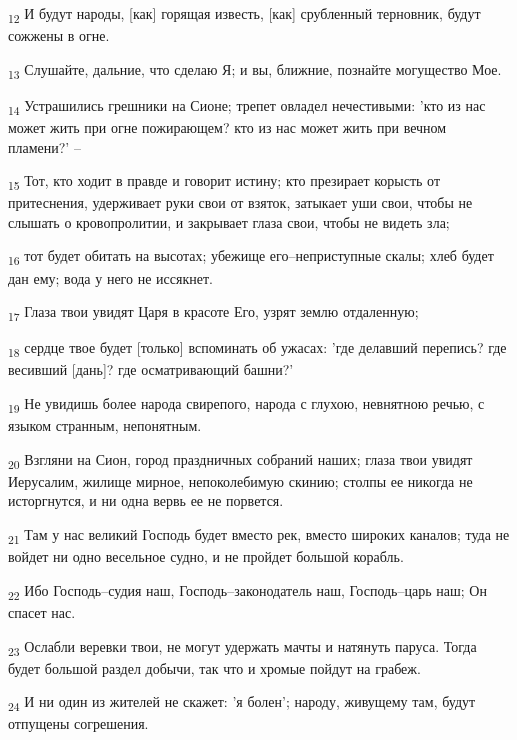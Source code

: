 \begin{tcolorbox}
\textsubscript{12} И будут народы, [как] горящая известь, [как] срубленный терновник, будут сожжены в огне.
\end{tcolorbox}
\begin{tcolorbox}
\textsubscript{13} Слушайте, дальние, что сделаю Я; и вы, ближние, познайте могущество Мое.
\end{tcolorbox}
\begin{tcolorbox}
\textsubscript{14} Устрашились грешники на Сионе; трепет овладел нечестивыми: 'кто из нас может жить при огне пожирающем? кто из нас может жить при вечном пламени?' --
\end{tcolorbox}
\begin{tcolorbox}
\textsubscript{15} Тот, кто ходит в правде и говорит истину; кто презирает корысть от притеснения, удерживает руки свои от взяток, затыкает уши свои, чтобы не слышать о кровопролитии, и закрывает глаза свои, чтобы не видеть зла;
\end{tcolorbox}
\begin{tcolorbox}
\textsubscript{16} тот будет обитать на высотах; убежище его--неприступные скалы; хлеб будет дан ему; вода у него не иссякнет.
\end{tcolorbox}
\begin{tcolorbox}
\textsubscript{17} Глаза твои увидят Царя в красоте Его, узрят землю отдаленную;
\end{tcolorbox}
\begin{tcolorbox}
\textsubscript{18} сердце твое будет [только] вспоминать об ужасах: 'где делавший перепись? где весивший [дань]? где осматривающий башни?'
\end{tcolorbox}
\begin{tcolorbox}
\textsubscript{19} Не увидишь более народа свирепого, народа с глухою, невнятною речью, с языком странным, непонятным.
\end{tcolorbox}
\begin{tcolorbox}
\textsubscript{20} Взгляни на Сион, город праздничных собраний наших; глаза твои увидят Иерусалим, жилище мирное, непоколебимую скинию; столпы ее никогда не исторгнутся, и ни одна вервь ее не порвется.
\end{tcolorbox}
\begin{tcolorbox}
\textsubscript{21} Там у нас великий Господь будет вместо рек, вместо широких каналов; туда не войдет ни одно весельное судно, и не пройдет большой корабль.
\end{tcolorbox}
\begin{tcolorbox}
\textsubscript{22} Ибо Господь--судия наш, Господь--законодатель наш, Господь--царь наш; Он спасет нас.
\end{tcolorbox}
\begin{tcolorbox}
\textsubscript{23} Ослабли веревки твои, не могут удержать мачты и натянуть паруса. Тогда будет большой раздел добычи, так что и хромые пойдут на грабеж.
\end{tcolorbox}
\begin{tcolorbox}
\textsubscript{24} И ни один из жителей не скажет: 'я болен'; народу, живущему там, будут отпущены согрешения.
\end{tcolorbox}
